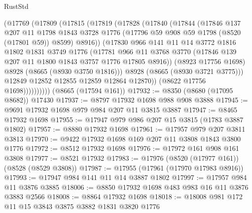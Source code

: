 \begin{lexlean}{RustStd}
\begin{coremodule}
                (@17769
                  (@17809
                    (@17815
                      (@17819
                        (@17828
                          (@17840
                            (@17844
                              (@17846
                                @137
                                @207
                                @11
                                @1798
                                @1843
                                @3728
                                @1776
                                (@17796 @59 @908 @59 @1798 (@8520 (@17801 @59)) @8599)
                                @8916))
                            (@17830
                              @966
                              @141
                              @11
                              @14
                              @3772
                              @1816
                              @1802
                              @1831
                              @3749
                              @1776
                              (@17781
                                @966
                                @11
                                @3768
                                @3770
                                (@17846 @139 @207 @11 @1800 @1843 @3757 @1776 @17805 @8916))
                              (@8923 @17756 @1698)
                              @8928
                              (@8665 (@8930 @3750 @1816)))
                            @8928
                            (@8665 (@8930 @3721 @3775)))
                          @12849
                          @12852
                          @12855
                          @12859
                          @12864
                          @12870))
                      (@8622 @17756 @1698))))))))))
    (@8665 (@17594 @161))
@17932 := @8350 (@8680 (@17095 @8682)) @17430
@17937 := @8797 @17932 @1698 @988 @908 @3888
@17945 := @9691 @17932 @1698 @979 @984 @207 @11 @3815 @3887
@17947 := @8465 @17932 @1698
@17955 := @17947 @979 @986 @207 @15 @3815 (@1783 @3887 @1802)
@17957 := @8880 @17932 @1698
@17961 := @17957 @979 @207 @3811 @3813
@17970 := @9422 @17932 @1698 @169 @207 @11 @3808 @1843 @3800 @1776
@17972 := @8512 @17932 @1698
@17976 := @17972 @161 @908 @161 @3808
@17977 := @8521 @17932
@17983 := @17976 (@8520 (@17977 @161)) (@8528 (@8529 @3808))
@17987 := @17955 (@17961 (@17970 @17983 @8916))
@17993 := @17947 @984 @141 @11 @14 @3887 @1802
@17997 := @17957 @984 @11 @3876 @3885
@18006 := @8850 @17932 @1698 @483 @983 @16 @11 @3876 @3883 @2566
@18008 := @8864 @17932 @1698
@18018 := @18008 @981 @172 @11 @15 @3843 @3875 @3882 @1831 @3820 @1776

\end{coremodule}
\end{lexlean}
